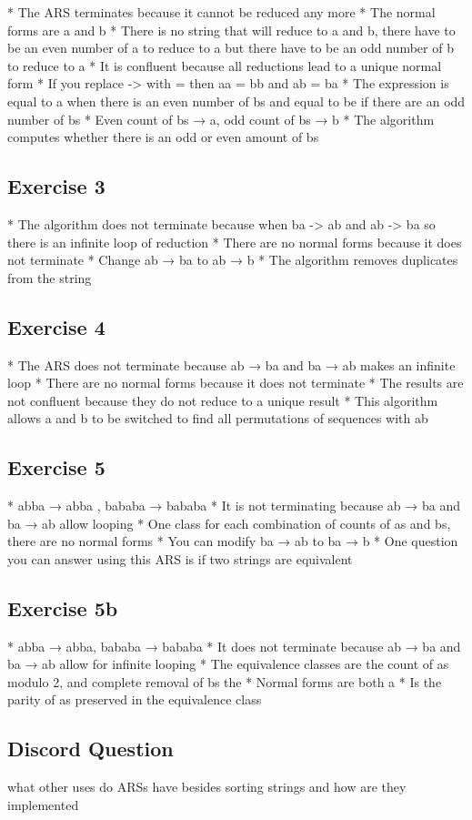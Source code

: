 \documentclass{article}
\theoremstyle{plain}
\theoremstyle{definition}
\theoremstyle{remark}
\begin{document}
* The ARS terminates because it cannot be reduced any more
* The normal forms are a and b
* There is no string that will reduce to a and b, there have to be an even number of a to reduce to a but there have to be an odd number of b to reduce to a
* It is confluent because all reductions lead to a unique normal form
* If you replace -> with = then aa = bb and ab = ba
* The expression is equal to a when there is an even number of bs and equal to be if there are an odd number of bs
* Even count of bs → a, odd count of bs → b
* The algorithm computes whether there is an odd or even amount of bs

\subsection{Exercise 3}

* The algorithm does not terminate because when ba -> ab and ab -> ba so there is an infinite loop of reduction
* There are no normal forms because it does not terminate
* Change ab → ba to ab → b
* The algorithm removes duplicates from the string

\subsection{Exercise 4}

* The ARS does not terminate because ab → ba and ba → ab makes an infinite loop
* There are no normal forms because it does not terminate
* The results are not confluent because they do not reduce to a unique result
* This algorithm allows a and b to be switched to find all permutations of sequences with ab

\subsection{Exercise 5}

* abba → abba , bababa → bababa
* It is not terminating because ab → ba and ba → ab allow looping
* One class for each combination of counts of as and bs, there are no normal forms
* You can modify ba → ab to ba → b
* One question you can answer using this ARS is if two strings are equivalent 

\subsection{Exercise 5b}

* abba → abba, bababa → bababa
* It does not terminate because ab → ba and ba → ab allow for infinite looping
* The equivalence classes are the count of as modulo 2, and complete removal of bs the 
* Normal forms are both a
* Is the parity of as preserved in the equivalence class

\subsection{Discord Question}

what other uses do ARSs have besides sorting strings and how are they implemented 
\end{document}
